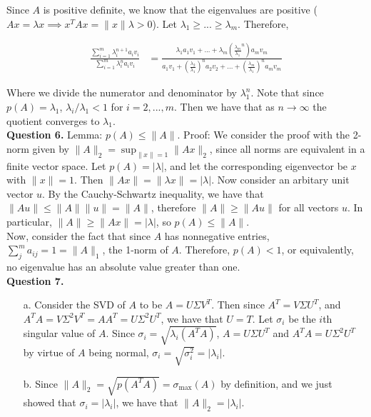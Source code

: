 \documentclass{article}
\newcommand{\ra}{\longrightarrow}
\begin{document}
Since $A$ is positive definite, we know that the eigenvalues are positive ($A x = \lambda x \implies x^TAx = \|x\| \lambda > 0$). Let $\lambda_1 \geq ... \geq \lambda_m$. Therefore, 

\begin{align*}
    \frac{\sum_{i=1}^m \lambda_i^{n+1}a_i v_i}{\sum_{i=1}^m \lambda_i^{n}a_i v_i} &= \frac{\lambda_1 a_1v_1+...+\lambda_m \left(\frac{\lambda_m}{\lambda_1}^n\right)a_mv_m}{a_1v_1+\left(\frac{\lambda_2}{\lambda_1}\right)^n a_2v_2 + ... +\left(\frac{\lambda_m}{\lambda_1}\right)^n a_m v_m}
\end{align*}

Where we divide the numerator and denominator by $\lambda_1^n$. Note that since $p(A)=\lambda_1$, $\lambda_i / \lambda_1 < 1$ for $i=2,...,m$. Then we have that as 
$n \ra \infty$ the quotient converges to $\lambda_1$. \\

\textbf{Question 6.} Lemma: $p(A) \leq \|A\|$. Proof: We consider the proof with the 2-norm given by $\|A\|_2 = \sup_{\|x\| = 1}\|Ax\|_2$, since all norms are equivalent in a finite vector space. Let $p(A) = |\lambda|$, and let the corresponding eigenvector be $x$ with $\|x\| = 1$. Then $\|Ax\| = \|\lambda x\| = |\lambda|$. Now consider an arbitary unit vector $u$. By the Cauchy-Schwartz inequality, we have that $\|Au\| \leq \|A\| \|u\| = \|A\|$, therefore $\|A \| \geq \|A u\|$ for all vectors $u$. In particular, $\|A\| \geq \|Ax\| = |\lambda|$, so $p(A) \leq \|A\|$. \\

Now, consider the fact that since $A$ has nonnegative entries, $\sum_{j}^m a_{ij}=1=\|A\|_1$, the 1-norm of $A$. Therefore, $p(A) < 1$, or equivalently, no eigenvalue has an absolute value greater than one. \\

\textbf{Question 7.} 
\begin{itemize}
    \item[a.] Consider the SVD of $A$ to be $A=U\Sigma V^T$. Then since $A^T = V\Sigma U^T$, and $A^TA = V\Sigma^2 V^T = AA^T = U\Sigma^2U^T$, we have that $U=T$. Let $\sigma_i$ be the $i$th singular value of $A$. Since $\sigma_i = \sqrt{\lambda_i(A^TA)}$, $A = U\Sigma U^T$ and  $A^TA = U\Sigma^2 U^T$ by virtue of $A$ being normal, $\sigma_i = \sqrt{\sigma_i^2} = |\lambda_i|$. 
    \item[b.] Since $\|A\|_2 = \sqrt{p(A^TA)} = \sigma_{\max}(A)$ by definition, and we just showed that $\sigma_i = |\lambda_i|$, we have that $\|A\|_2 = |\lambda_i|$. 
\end{itemize}   
\end{document}
